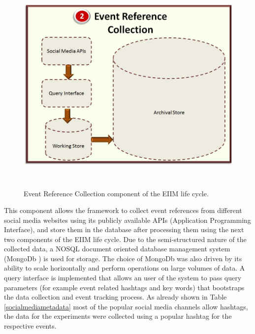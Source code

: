 \begin{figure}[htbp]
  \caption{Event Reference Collection component of the EIIM life cycle.}
  \centering
    \includegraphics[width=14cm,height=11cm]{Figures/EventReferenceCollection.jpg}
\end{figure}

This component allows the framework to collect event references from different social media websites using its publicly available APIs (Application Programming Interface), and store them in the database after processing them using the next two components of the EIIM life cycle. Due to the semi-structured nature of the collected data, a NOSQL document oriented database management system (MongoDb ) is used for storage. The choice of MongoDb was also driven by its ability to scale horizontally and perform operations on large volumes of data. A query interface is implemented that allows an user of the system to pass query parameters (for example event related hashtags and key words) that bootstraps the data collection and event tracking process. As already shown in Table \ref{socialmediametadata} most of the popular social media channels allow hashtags, the data for the experiments were collected using a popular hashtag for the respective events. 



